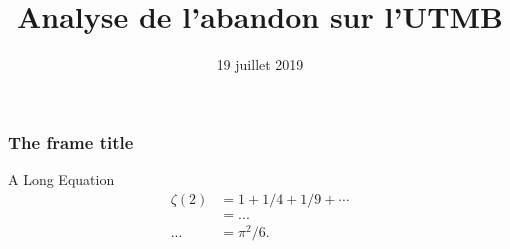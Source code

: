 \documentclass[10pt,color]{beamer}
\title{Analyse de l'abandon sur l'UTMB}
\institute[Université Grenoble Alpes]{Université Grenoble Alpes}
\date{19 juillet 2019}
\begin{document}
\maketitle

\begin{frame}
   \frametitle{The frame title}
  {A Long Equation}
  \begin{align}
  \zeta(2) &= 1 + 1/4 + 1/9 + \cdots \\
  &= ... \\
  ...
  &= \pi^2/6.
  \end{align}
\end{frame} 
\end{document}
